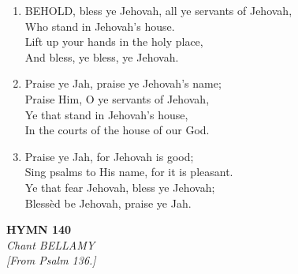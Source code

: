 \documentclass[11pt,a4paper]{article}
\begin{document}
\begin{enumerate}
    \item BEHOLD, bless ye Jehovah, all ye servants of Jehovah, \\
        Who stand in Jehovah's house. \\
        Lift up your hands in the holy place, \\
        And bless, ye bless, ye Jehovah.

    \item Praise ye Jah, praise ye Jehovah's name; \\
        Praise Him, O ye servants of Jehovah, \\
        Ye that stand in Jehovah's house, \\
        In the courts of the house of our God.

    \item Praise ye Jah, for Jehovah is good; \\
        Sing psalms to His name, for it is pleasant. \\
        Ye that fear Jehovah, bless ye Jehovah; \\
        Bless\`ed be Jehovah, praise ye Jah.

\end{enumerate}

\newpage
\begin{center}
    {\Large \textbf{HYMN 140}}
    \\
    \textit{Chant BELLAMY}
    \\
    \textit{\small [From Psalm 136.]}
\end{center}
\vspace{1em}
\end{document}
